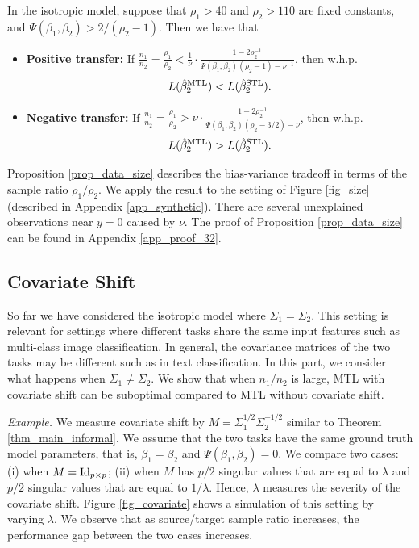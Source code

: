 \begin{proposition}\label{prop_data_size}
	In the isotropic model, suppose that $\rho_1 > 40$ and $\rho_2 > 110$ are fixed constants, and $\Psi(\beta_1, \beta_2) > 2/(\rho_2 - 1)$.
	Then we have that
	\begin{itemize}
		\item \textbf{Positive transfer:} If $\frac{n_1}{n_2} = \frac{\rho_1}{\rho_2} < \frac{1}{\nu} \cdot \frac{1 - 2\rho_2^{-1}}{\Psi(\beta_1, \beta_2) (\rho_2 - 1) - \nu^{-1}}$, then w.h.p. $$L(\hat{\beta}_2^{\textup{MTL}}) < L(\hat{\beta}_2^{\textup{STL}}).$$
		\item \textbf{Negative transfer:} If $\frac{n_1}{n_2} = \frac{\rho_1}{\rho_2} > {\nu} \cdot \frac{1 - 2\rho_2^{-1}}{\Psi(\beta_1, \beta_2) (\rho_2 - 3/2) - \nu}$, then w.h.p. $$L(\hat{\beta}_2^{\textup{MTL}}) > L(\hat{\beta}_2^{\textup{STL}}).$$
	\end{itemize}
\end{proposition}
Proposition \ref{prop_data_size} describes the bias-variance tradeoff in terms of the sample ratio $\rho_1 / \rho_2$.
We apply the result to the setting of Figure \ref{fig_size} (described in Appendix \ref{app_synthetic}).
There are several unexplained observations near $y = 0$ caused by $\nu$.
The proof of Proposition \ref{prop_data_size} can be found in Appendix \ref{app_proof_32}.

\subsection{Covariate Shift}\label{sec_covshift}

So far we have considered the isotropic model where $\Sigma_1 = \Sigma_2$.
This setting is relevant for settings where different tasks share the same input features such as multi-class image classification.
In general, the covariance matrices of the two tasks may be different such as in text classification.
In this part, we consider what happens when $\Sigma_1 \neq \Sigma_2$.
We show that when $n_1 / n_2$ is large, MTL with covariate shift can be suboptimal compared to MTL without covariate shift.

\noindent\textit{Example.}
	We measure covariate shift by $M = \Sigma_1^{1/2} \Sigma_2^{-1/2}$ similar to Theorem \ref{thm_main_informal}.
	We assume that the two tasks have the same ground truth model parameters, that is, $\beta_1 = \beta_2$ and $\Psi(\beta_1, \beta_2) = 0$.
	We compare two cases: (i) when $M = \operatorname{Id}_{p\times p}$; (ii) when $M$ has $p/2$ singular values that are equal to $\lambda$ and $p/2$ singular values that are equal to $1 / \lambda$.
	Hence, $\lambda$ measures the severity of the covariate shift.
	Figure \ref{fig_covariate} shows a simulation of this setting by varying $\lambda$.
	We observe that as source/target sample ratio increases, the performance gap between the two cases increases.

